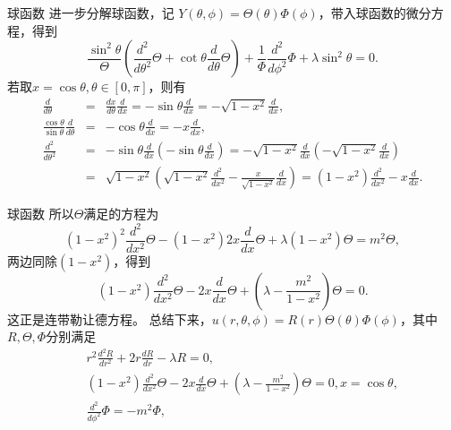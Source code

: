 \documentclass[11pt]{beamer}
\begin{document}
\begin{frame}{球函数}
进一步分解球函数，记 $Y(\theta, \phi) = \Theta(\theta) \Phi(\phi)$，带入球函数的微分方程，得到
\begin{equation}
\frac{\sin^2 \theta}{\Theta} ( \frac{d^2}{d \theta^2} \Theta + \cot \theta \frac{d}{d \theta} \Theta )
+ \frac{1}{\Phi} \frac{d^2}{d \phi^2}\Phi + \lambda \sin^2 \theta = 0.
\end{equation}
若取$x = \cos \theta, \theta \in [0, \pi]$，则有
\begin{eqnarray}
\frac{d}{d\theta} &=& \frac{dx}{d \theta} \frac{d}{dx} = - \sin \theta \frac{d}{dx} = - \sqrt{1-x^2}\frac{d}{dx}, \\
\frac{\cos \theta}{\sin \theta} \frac{d}{d \theta} &=& - \cos \theta \frac{d}{dx} = - x \frac{d}{dx}, \\
\frac{d^2}{d \theta^2} &=& - \sin \theta \frac{d}{dx} ( - \sin \theta \frac{d}{dx}) = - \sqrt{1-x^2}\frac{d}{dx}( - \sqrt{1-x^2} \frac{d}{dx})
\\
&=& \sqrt{1-x^2}( \sqrt{1-x^2}\frac{d^2}{dx^2} - \frac{x}{\sqrt{1-x^2}}\frac{d}{dx} ) = (1-x^2) \frac{d^2}{dx^2} - x \frac{d}{dx}. \nonumber
\end{eqnarray}
\end{frame}

\begin{frame}{球函数}
所以$\Theta$满足的方程为
\begin{equation}
(1-x^2)^2 \frac{d^2}{dx^2}\Theta - (1-x^2) 2x \frac{d}{dx}\Theta + \lambda(1-x^2)\Theta = m^2\Theta,
\end{equation}
两边同除$(1-x^2)$，得到
\begin{equation}
(1-x^2) \frac{d^2}{dx^2}\Theta - 2x \frac{d}{dx}\Theta + (\lambda - \frac{m^2}{1-x^2} ) \Theta = 0.
\end{equation}
这正是连带勒让德方程。
总结下来，$u(r,\theta,\phi) = R(r) \Theta(\theta) \Phi(\phi)$，其中$R, \Theta, \Phi$分别满足
\begin{eqnarray}
&& r^2 \frac{d^2 R}{dr^2} + 2r \frac{dR}{dr} - \lambda R = 0, \\
&& (1-x^2) \frac{d^2}{dx^2}\Theta - 2x \frac{d}{dx}\Theta + (\lambda - \frac{m^2}{1-x^2} ) \Theta = 0, x = \cos \theta, \\
&& \frac{d^2}{d\phi^2}\Phi = - m^2 \Phi,
\end{eqnarray}
\end{frame}
\end{document}

